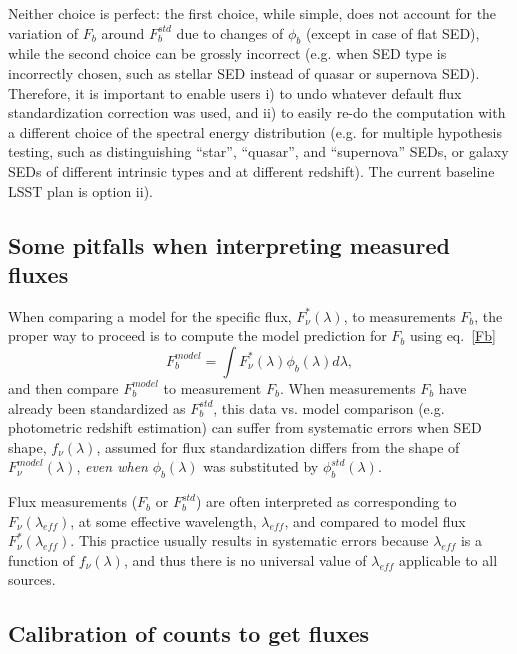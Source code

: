 \documentclass{emulateapj}
\begin{document}
Neither choice is perfect: the first choice, while simple, does not account for the variation of $F_b$ around
$F^{std}_b$ due to changes of $\phi_b$ (except in case of flat SED), while the second choice
can be grossly incorrect (e.g. when SED type is incorrectly chosen, such as stellar SED instead
of quasar or supernova SED). Therefore, it is important to enable users i) to undo whatever default 
flux standardization correction was used, and ii) to easily re-do the computation with a different choice 
of the spectral energy distribution (e.g. for multiple hypothesis testing, such as distinguishing
``star'', ``quasar'', and ``supernova'' SEDs, or galaxy SEDs of different intrinsic types and at 
different redshift). The current baseline LSST plan is option ii). 

\subsection{Some pitfalls when interpreting measured fluxes}

When comparing a model for the specific flux, $F_\nu^\ast(\lambda)$, to  
measurements $F_b$, the proper way to proceed is to compute the model prediction 
for $F_b$ using eq.~\ref{Fb}
\begin{equation}
\label{FbModel}
             F^{model}_b = \int{F_\nu^\ast(\lambda) \phi_b(\lambda) d\lambda},
\end{equation}
and then compare $F^{model}_b$ to measurement $F_b$.  
When measurements $F_b$ have already been standardized as $F^{std}_b$, 
this data vs. model comparison (e.g. photometric redshift estimation) can 
suffer from systematic errors when SED shape, $f_\nu(\lambda)$,  assumed 
for flux standardization differs from the shape of $F_\nu^{model}(\lambda)$,
{\it even when} $\phi_b(\lambda)$ was substituted by $\phi^{std}_b(\lambda)$. 

Flux measurements ($F_b$ or $F^{std}_b$) are often interpreted as corresponding to 
$F_\nu(\lambda_{eff})$, at some effective wavelength, $\lambda_{eff}$, and compared 
to model flux $F_\nu^\ast(\lambda_{eff})$. This practice usually results in systematic
errors because $\lambda_{eff}$ is a function of $f_\nu(\lambda)$, and thus there
is no universal value of $\lambda_{eff}$ applicable to all sources. 


\subsection{Calibration of counts to get fluxes} 
\end{document}
